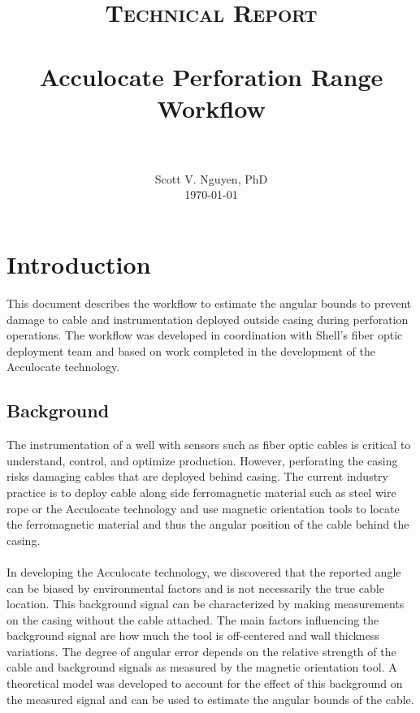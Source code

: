 \documentclass[paper=a4, fontsize=11pt]{scrartcl}
\title{
		\usefont{OT1}{bch}{b}{n}
		\normalfont \normalsize \textsc{Technical Report} \\ [25pt]
		\horrule{0.5pt} \\[0.4cm]
		\huge Acculocate Perforation Range Workflow \\
		\horrule{2pt} \\[0.5cm]
}
\author{
		\normalfont 								\normalsize
        Scott V. Nguyen, PhD\\[-3pt]		\normalsize
        \today
}
\date{}
\numberwithin{equation}{section}		%
\numberwithin{figure}{section}			%
\numberwithin{table}{section}				%
\begin{document}
\maketitle
\section{Introduction}
This document describes the workflow to estimate the angular bounds to prevent damage to cable and instrumentation deployed outside casing during perforation operations.  The workflow was developed in coordination with Shell's fiber optic deployment team and based on work completed in the development of the Acculocate technology.  

\subsection{Background}
The instrumentation of a well with sensors such as fiber optic cables is critical to understand, control, and optimize production.  However, perforating the casing risks damaging cables that are deployed behind casing.  The current industry practice is to deploy cable along side ferromagnetic material such as steel wire rope or the Acculocate technology and use magnetic orientation tools to locate the ferromagnetic material and thus the angular position of the cable behind the casing.  

\paragraph{}
In developing the Acculocate technology, we discovered that the reported angle can be biased by environmental factors and is not necessarily the true cable location.  This background signal can be characterized by making measurements on the casing without the cable attached.  The main factors influencing the background signal are how much the tool is off-centered and wall thickness variations.  The degree of angular error depends on the relative strength of the cable and background signals as measured by the magnetic orientation tool.  A theoretical model was developed to account for the effect of this background on the measured signal and can be used to estimate the angular bounds of the cable.  
\end{document}
